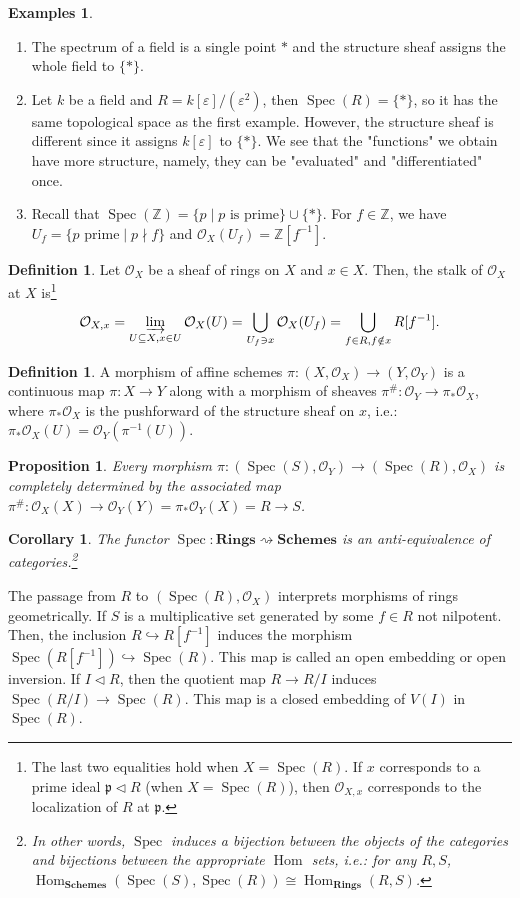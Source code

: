 \documentclass{tufte-handout} %
\newtheorem{cor}[thm]{Corollary}
\newtheorem{prop}[thm]{Proposition}
\theoremstyle{definition}
\newtheorem{defn}[thm]{Definition}
\newtheorem{exmps}[thm]{Examples}
\theoremstyle{remark}
\newcommand{\Z}{\mathbb{Z}}
\newcommand{\mO}{\mathcal{O}}
\newcommand{\lp}{{\mathfrak{p}}}
\DeclareMathOperator{\Hom}{Hom}
\DeclareMathOperator{\spec}{Spec}
\begin{document}
\begin{exmps}
	\begin{enumerate}
		\item The spectrum of a field is a single point $\ast$ and the structure sheaf assigns the whole field to $\{\ast\}$.
		\item Let $k$ be a field and $R = k[\varepsilon]/(\varepsilon^2)$, then $\spec(R) = \{\ast\}$, so it has the same topological space as the first example. However, the structure sheaf is different since it assigns $k[\varepsilon]$ to $\{\ast\}$. We see that the "functions" we obtain have more structure, namely, they can be "evaluated" and "differentiated" once.
		\item Recall that $\spec(\Z) = \{p \mid p \text{ is prime}\} \cup \{\ast\}$. For $f \in \Z$, we have $U_f = \{p \text{ prime} \mid p \nmid f\}$ and $\mO_X(U_f) = \Z[f^{-1}]$.
	\end{enumerate}
\end{exmps}
\begin{defn}
	Let $\mO_X$ be a sheaf of rings on $X$ and $x \in X$. Then, the stalk of $\mO_X$ at $X$ is\footnote{The last two equalities hold when $X = \spec(R)$. If $x$ corresponds to a prime ideal $\lp \lhd R$ (when $X = \spec(R)$), then $\mO_{X,x}$ corresponds to the localization of $R$ at $\lp$.} \[\mO_{X,x} = \varinjlim_{U \subseteq X, x \in U} \mO_X(U) = \bigcup_{U_f \ni x} \mO_X(U_f) = \bigcup_{f \in R, f \notin x} R[f^{-1}].\]
\end{defn}
\begin{defn}
	A morphism of affine schemes $\pi:(X,\mO_X) \rightarrow (Y, \mO_Y)$ is a continuous map $\pi: X\rightarrow Y$ along with a morphism of sheaves $\pi^\# : \mO_Y \rightarrow \pi_*\mO_X$, where $\pi_*\mO_X$ is the pushforward of the structure sheaf on $x$, i.e.: $\pi_*\mO_X(U) = \mO_Y(\pi^{-1}(U))$.
\end{defn}
\begin{prop}
	Every morphism $\pi:(\spec(S), \mO_Y) \rightarrow (\spec(R), \mO_X)$ is completely determined by the associated map $\pi^\#: \mO_X(X) \rightarrow \mO_Y(Y) = \pi_*\mO_Y(X) = R \rightarrow S$.
\end{prop}
\begin{cor}
	The functor $\spec: \textbf{Rings} \rightsquigarrow \textbf{Schemes}$ is an anti-equivalence of categories.\footnote{In other words, $\spec$ induces a bijection between the objects of the categories and bijections between the appropriate $\Hom$ sets, i.e.: for any $R,S$,  $\Hom_{\textbf{Schemes}}(\spec(S), \spec(R)) \cong \Hom_{\textbf{Rings}}(R,S)$.}
\end{cor}
The passage from $R$ to $(\spec(R), \mO_X)$ interprets morphisms of rings geometrically. If $S$ is a multiplicative set generated by some $f \in R$ not nilpotent. Then, the inclusion $R \hookrightarrow R[f^{-1}]$ induces the morphism $\spec(R[f^{-1}]) \hookrightarrow \spec(R)$. This map is called an open embedding or open inversion. If $I \lhd R$, then the quotient map $R \rightarrow R/I$ induces $\spec(R/I) \rightarrow \spec(R)$. This map is a closed embedding of $V(I)$ in $\spec(R)$.
\end{document}
